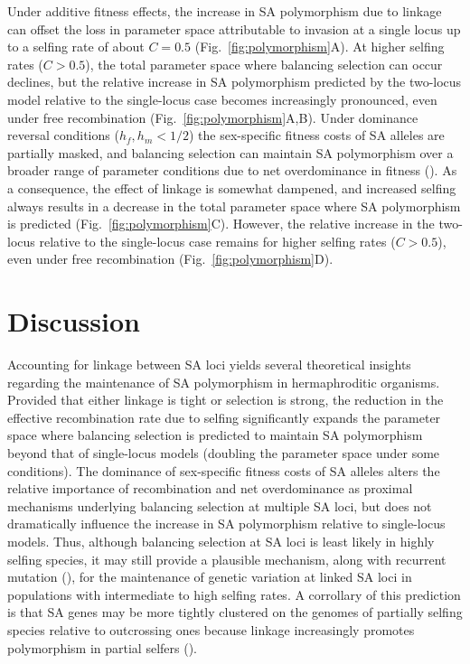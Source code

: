 \documentclass{article}
\begin{document}
Under additive fitness effects, the increase in SA polymorphism due to linkage can offset the loss in parameter space attributable to invasion at a single locus up to a selfing rate of about $C = 0.5$ (Fig.~\ref{fig:polymorphism}A). At higher selfing rates ($C > 0.5$), the total parameter space where balancing selection can occur declines, but the relative increase in SA polymorphism predicted by the two-locus model relative to the single-locus case becomes increasingly pronounced, even under free recombination (Fig.~\ref{fig:polymorphism}A,B). Under dominance reversal conditions ($h_f,h_m < 1/2$) the sex-specific fitness costs of SA alleles are partially masked, and balancing selection can maintain SA polymorphism over a broader range of parameter conditions due to net overdominance in fitness (\citealt{ConnClark2012, ConnClark2014}). As a consequence, the effect of linkage is somewhat dampened, and increased selfing always results in a decrease in the total parameter space where SA polymorphism is predicted (Fig.~\ref{fig:polymorphism}C). However, the relative increase in the two-locus relative to the single-locus case remains for higher selfing rates ($C > 0.5$), even under free recombination (Fig.~\ref{fig:polymorphism}D).



\section*{Discussion}

Accounting for linkage between SA loci yields several theoretical insights regarding the maintenance of SA polymorphism in hermaphroditic organisms. Provided that either linkage is tight or selection is strong, the reduction in the effective recombination rate due to selfing significantly expands the parameter space where balancing selection is predicted to maintain SA polymorphism beyond that of single-locus models (doubling the parameter space under some conditions). The dominance of sex-specific fitness costs of SA alleles alters the relative importance of recombination and net overdominance as proximal mechanisms underlying balancing selection at multiple SA loci, but does not dramatically influence the increase in SA polymorphism relative to single-locus models. Thus, although balancing selection at SA loci is least likely in highly selfing species, it may still provide a plausible mechanism, along with recurrent mutation (\citealt{JordanConn2014}), for the maintenance of genetic variation at linked SA loci in populations with intermediate to high selfing rates. A corrollary of this prediction is that SA genes may be more tightly clustered on the genomes of partially selfing species relative to outcrossing ones because linkage increasingly promotes polymorphism in partial selfers (\citealt{Patten2010}).
\end{document}
